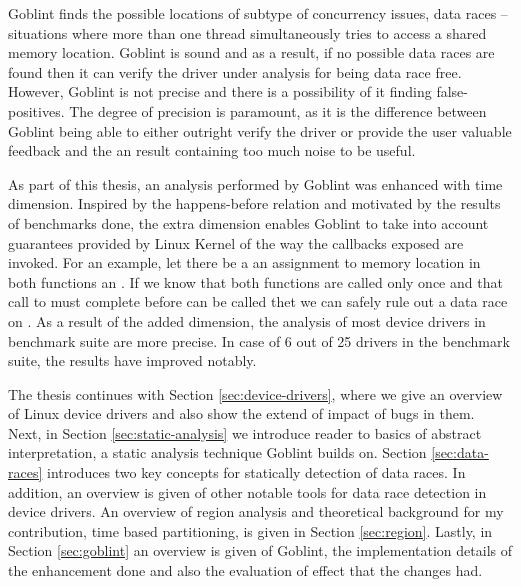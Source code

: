 \documentclass[..thesis.tex]{subfiles}
\begin{document}
Goblint finds the possible locations of subtype of concurrency issues, data races -- situations where more than one thread simultaneously tries to access a shared memory location.
Goblint is sound and as a result, if no possible data races are found then it can verify the driver under analysis for being data race free.
However, Goblint is not precise and there is a possibility of it finding false-positives. The degree of precision is paramount,
as it is the difference between Goblint being able to either outright verify the driver or provide the user valuable feedback and the an result containing too much noise to be useful.
  

As part of this thesis, an analysis performed by Goblint was enhanced with time dimension. Inspired by the happens-before relation and motivated by the results of benchmarks done,
the extra dimension enables Goblint to take into account guarantees provided by Linux Kernel of the way the callbacks exposed are invoked.
For an example, let there be a an assignment to memory location  in both functions  an . 
If we know that both functions are called only once and that call to  must complete before  can be called thet we can safely rule out a data race on .
As a result of the added dimension, the analysis of most device drivers in benchmark suite are more precise. In case of 6 out of 25 drivers in the benchmark suite,
the results have improved notably.


The thesis continues with Section \ref{sec:device-drivers}, where we give an overview of Linux device drivers and also show the extend of impact of bugs in them.
Next, in Section \ref{sec:static-analysis} we introduce reader to basics of abstract interpretation, a static analysis technique Goblint builds on.
Section \ref{sec:data-races} introduces two key concepts for statically detection of data races.
In addition, an overview is given of other notable tools for data race detection in device drivers. An overview of region analysis and theoretical background for my contribution,
time based partitioning, is given in Section \ref{sec:region}. Lastly, in Section \ref{sec:goblint} an overview is given of Goblint,
the implementation details of the enhancement done  and also the evaluation of effect that the changes had.  
\end{document}
